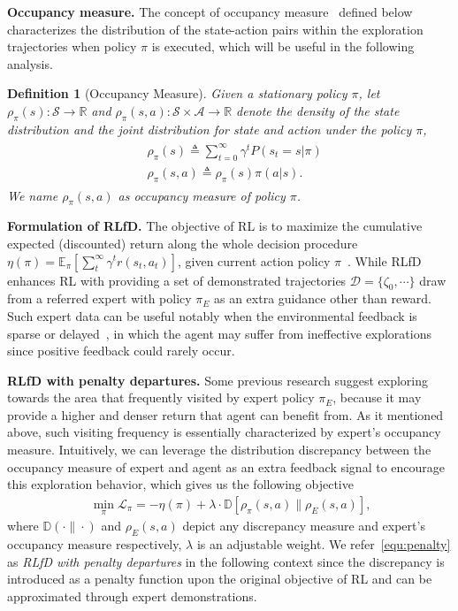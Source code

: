 \documentclass[letterpaper]{article} %
\newtheorem{definition}{Definition}
\begin{document}
\noindent
\textbf{Occupancy measure.} The concept of occupancy measure~\cite{mdp_book,irl_lp} defined below characterizes the distribution of the state-action pairs within the exploration trajectories when policy $\pi$ is executed, which will be useful in the following analysis.
\begin{definition}[Occupancy Measure]\label{def:rho_sa}
Given a stationary policy $\pi$, let $\rho_\pi(s): \mathcal{S} \rightarrow \mathbb{R}$ and $\rho_\pi(s, a): \mathcal{S}\times\mathcal{A} \rightarrow \mathbb{R}$ denote the density of the state distribution and the joint distribution for state and action under the policy $\pi$,
\begin{align}\label{equ:rho_s}
\begin{split}
    &\rho_\pi(s)  \triangleq \sum_{t=0}^{\infty}\gamma^t P(s_t=s|\pi) \\
    &\rho_\pi(s,a) \triangleq \rho_\pi(s)\pi(a|s)\text{.}
\end{split}
\end{align}
We name $\rho_\pi(s,a)$ as occupancy measure of policy $\pi$. 
\end{definition}
\noindent
\textbf{Formulation of RLfD.} The objective of RL is to maximize the cumulative expected (discounted) return along the whole decision procedure $\eta(\pi) = \mathbb{E}_\pi[\sum_t^\infty \gamma^tr(s_t, a_t)]$, given current action policy $\pi$~\cite{rl_book}. While RLfD enhances RL with providing a set of demonstrated trajectories $\mathcal{D} = \{\zeta_0, \cdots\}$ draw from a referred expert with policy $\pi_E$ as an extra guidance other than reward. Such expert data can be useful notably when the environmental feedback is sparse or delayed~\cite{ICM}, in which the agent may suffer from ineffective explorations since positive feedback could rarely occur. 

\noindent
\textbf{RLfD with penalty departures.} Some previous research\cite{ijcaipofd1,pofd} suggest exploring towards the area that frequently visited by expert policy $\pi_E$, because it may provide a higher and denser return that agent can benefit from. As it mentioned above, such visiting frequency is essentially characterized by expert's occupancy measure. Intuitively, we can leverage the distribution discrepancy between the occupancy measure of expert and agent as an extra feedback signal to encourage this exploration behavior, which gives us the following objective
\begin{align}\label{equ:penalty}
    \min_\pi \mathcal{L}_\pi = -\eta(\pi) + \lambda\cdot \mathbb{D}\left[\rho_\pi(s,a) \| \rho_E(s,a)\right]\text{,}
\end{align}
where $\mathbb{D}(\cdot\|\cdot)$ and $\rho_E(s,a)$ depict any discrepancy measure and expert's occupancy measure respectively, $\lambda$ is an adjustable weight. We refer~\eqref{equ:penalty} as \emph{RLfD with penalty departures} in the following context since the discrepancy is introduced as a penalty function upon the original objective of RL and can be approximated through expert demonstrations. 
\end{document}
